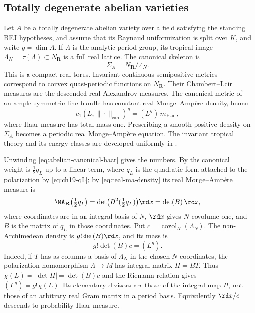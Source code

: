 \subsection{Totally degenerate abelian varieties}
\label{sec:ch31-abelian}

Let $A$ be a totally degenerate abelian variety over a field satisfying the
standing BFJ hypotheses, and assume that its Raynaud uniformization is split
over $K$, and write $g=\dim A$.  If $\Lambda$ is the analytic period
group, its tropical image $\Lambda_N=\tau(\Lambda)\subset N_\mathbf R$
is a full real lattice.  The canonical skeleton is
\[
                         \Sigma_A=N_\mathbf R/\Lambda_N.
\]
This is a compact real torus.  Invariant continuous semipositive metrics correspond
to convex quasi-periodic functions on $N_\mathbf R$.  Their
Chambert--Loir measures are the descended real Alexandrov measures.  The
canonical metric of an ample symmetric line bundle has constant real
Monge--Amp\`ere density, hence
\begin{equation}
               c_1(L,\|\cdot\|_{\mathrm{can}})^g
               =(L^g)\,m_{\mathrm{Haar}},
\label{eq:abelian-canonical-haar}
\end{equation}
where Haar measure has total mass one.  Prescribing a smooth positive density
on $\Sigma_A$ becomes a periodic real Monge--Amp\`ere equation.  The
invariant tropical theory and its energy classes are developed uniformly in
\cite{BGJKK25}.

Unwinding \eqref{eq:abelian-canonical-haar} gives the numbers.  By
 the canonical weight is
$\tfrac12q_L$ up to a linear term, where $q_L$ is the quadratic form
attached to the polarization by \eqref{eq:ch19-qL}; by
\eqref{eq:real-ma-density} its real Monge--Amp\`ere measure is
\begin{equation}
\label{eq:ch31-abelian-density}
 \MA_{\mathbf R}\bigl(\tfrac12q_L\bigr)
 =\det\bigl(D^2(\tfrac12q_L)\bigr)\rd x=\det(B)\,\rd x,
\end{equation}
where coordinates are in an integral basis of $N$, $\rd x$ gives $N$
covolume one, and $B$ is the matrix of $q_L$ in those coordinates.
Put $c=\operatorname{covol}_N(\Lambda_N)$.  The non-Archimedean density
is $g!\det(B)\rd x$, and its mass is
\begin{equation}
\label{eq:ch31-abelian-mass}
 g!\det(B)c=(L^g).
\end{equation}
Indeed, if $T$ has as columns a basis of $\Lambda_N$ in the chosen
$N$-coordinates, the polarization homomorphism $\Lambda\to M$ has
integral matrix $H=BT$.  Thus
$\chi(L)=|\det H|=\det(B)c$ and the Riemann relation gives
$(L^g)=g!\chi(L)$.  Its elementary divisors are those of the integral
map $H$, not those of an arbitrary real Gram matrix in a period basis.
Equivalently $\rd x/c$ descends to probability Haar measure.

